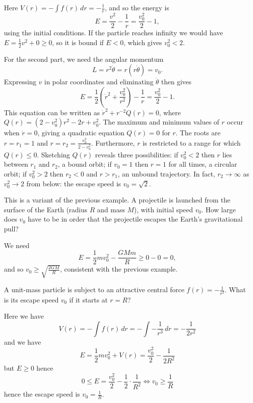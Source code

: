 \documentclass[10pt, a4paper]{article}
\begin{document}
\begin{solution}
    Here $V(r) = -\int f(r)\,dr = -\frac{1}{r}$,
    and so the energy is
    \[
    E = \frac{v ^ 2}{2} - \frac{1}{r} = \frac{v_0 ^ 2}{2} - 1,
    \]
    using the initial conditions.
    If the particle reaches infinity we would have $E = \frac{1}{2}v ^ 2 + 0 \geq 0$,
    so it is bound if $E < 0$,
    which gives $v_0 ^ 2 < 2$.

    For the second part,
    we need the angular momentum
    \[
    L = r ^ 2\dot{\theta} = r(r\dot{\theta}) = v_0.
    \]
    Expressing $v$ in polar coordinates and eliminating $\dot{\theta}$ then gives
    \[
    E = \frac{1}{2}\left(\dot{r} ^ 2 + \frac{v_0 ^ 2}{r ^ 2}\right) - \frac{1}{r} = \frac{v_0 ^ 2}{2} - 1.
    \]
    This equation can be written as $\dot{r} ^ 2 + r ^ {-2}Q(r) = 0$,
    where $Q(r) = (2 - v_0 ^ 2)r ^ 2 - 2r + v_0 ^ 2$.
    The maximum and minimum values of $r$ occur when $\dot{r} = 0$,
    giving a quadratic equation $Q(r) = 0$ for $r$.
    The roots are $r = r_1 = 1$ and $r = r_2 = \frac{v_0 ^ 2}{2 - v_0 ^ 2}$.
    Furthermore,
    $r$ is restricted to a range for which $Q(r) \leq 0$.
    Sketching $Q(r)$ reveals three possibilities:
    if $v_0 ^ 2 < 2$ then $r$ lies between $r_1$ and $r_2$,
    a bound orbit;
    if $v_0 = 1$ then $r = 1$ for all times,
    a circular orbit;
    if $v_0 ^ 2 > 2$ then $r_2 < 0$ and $r > r_1$,
    an unbound trajectory.
    In fact,
    $r_2 \rightarrow \infty$ as $v_0 ^ 2 \rightarrow 2$ from below:
    the escape speed is $v_0 = \sqrt{2}$.
\end{solution}

\begin{example}
    This is a variant of the previous example.
    A projectile is launched from the surface of the Earth
    (radius $R$ and mass $M$),
    with initial speed $v_0$.
    How large does $v_0$ have to be in order that the projectile escapes the Earth's gravitational pull?

    \begin{solution}
        We need
        \[
        E = \frac{1}{2}mv_0 ^ 2 - \frac{GMm}{R} \geq 0 - 0 = 0,
        \]
        and so $v_0 \geq \sqrt{\frac{2GM}{R}}$,
        consistent with the previous example.
    \end{solution}
\end{example}

\begin{example}
    A unit-mass particle is subject to an attractive central force $f(r) = -\frac{1}{r ^ 3}$.
    What is its escape speed $v_0$ if it starts at $r = R$?

    \begin{solution}
        Here we have
        \[
        V(r) = -\int f(r)\,dr = -\int-\frac{1}{r ^ 3}\,dr = -\frac{1}{2r ^ 2}
        \]
        and we have
        \[
        E = \frac{1}{2}mv_0 ^ 2 + V(r) = \frac{v_0 ^ 2}{2} - \frac{1}{2R ^ 2}
        \]
        but $E \geq 0$ hence
        \[
        0 \leq E = \frac{v_0 ^ 2}{2} - \frac{1}{2}\cdot\frac{1}{R ^ 2} \iff v_0 \geq \frac{1}{R}
        \]
        hence the escape speed is $v_0 = \frac{1}{R}$.
    \end{solution}
\end{example}
\end{document}
